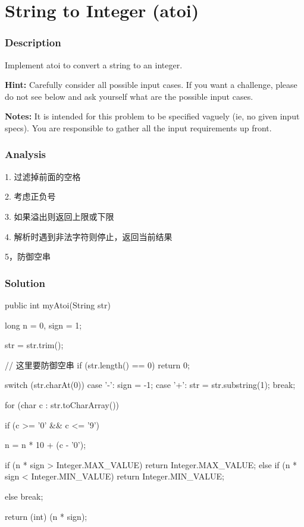 \newpage

\section{String to Integer (atoi)} %

\subsubsection{Description}
Implement atoi to convert a string to an integer.

\textbf{Hint:} Carefully consider all possible input cases. If you want a challenge, please do not see below and ask yourself what are the possible input cases.

\textbf{Notes:} It is intended for this problem to be specified vaguely (ie, no given input specs). You are responsible to gather all the input requirements up front.

\subsubsection{Analysis}
1. 过滤掉前面的空格

2. 考虑正负号

3. 如果溢出则返回上限或下限

4. 解析时遇到非法字符则停止，返回当前结果

5，防御空串

\subsubsection{Solution}

\begin{Code}
public int myAtoi(String str) {
    long n = 0, sign = 1;

    str = str.trim();

    // 这里要防御空串
    if (str.length() == 0) { return 0; }

    switch (str.charAt(0)) {
        case '-':
            sign = -1;
        case '+':
            str = str.substring(1);
            break;
    }

    for (char c : str.toCharArray()) {
        if (c >= '0' && c <= '9') {
            n = n * 10 + (c - '0');

            if (n * sign > Integer.MAX_VALUE) {
                return Integer.MAX_VALUE;
            } else if (n * sign < Integer.MIN_VALUE) {
                return Integer.MIN_VALUE;
            }
        } else {
            break;
        }
    }
    return (int) (n * sign);
}
\end{Code}

